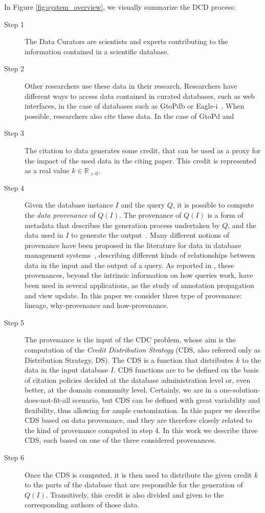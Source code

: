 In Figure \ref{fig:system_overview}, we visually summarize the DCD process:
\begin{description}
	\item[Step 1] The Data Curators are scientists and experts contributing to the information contained in a scientific database. 
	\item[Step 2] Other researchers use these data in their research. Researchers have different ways to access data contained in curated databases, such as web interfaces, in the case of databases such as GtoPdb \citep{iuphar2018} or Eagle-i~\citep{eagleI2017}. When possible, researchers also cite these data. In the case of GtoPd and 
	\item[Step 3] The citation to data generates some credit, that can be used as a proxy for the impact of the used data in the citing paper. This credit is represented as a real value $k \in \mathbb{R}_{>0}$. %
	\item[Step 4] Given the database instance $I$ and the query $Q$, it is possible to compute the \emph{data provenance} of $Q(I)$. The provenance of $Q(I)$ is a form of metadata that describes the generation process undertaken by $Q$, and the data used in $I$ to generate the output~\citep{CheneyProvSurvey}. Many different notions of provenance have been proposed in the literature for data in database management systems~\citep{lineageCui, WhyProvBuneman, howProvenanceGreen, dosso2020prov}, describing different kinds of relationships between data in the input and the output of a query. As reported in \citep{CheneyProvSurvey}, these provenances, beyond the intrinsic information on how queries work, have been used in several applications, as the study of annotation propagation and view update. In this paper we consider three type of provenance: lineage, why-provenance and how-provenance.
	\item[Step 5] The provenance is the input of the CDC problem, whose aim is the computation of the \emph{Credit Distribution Strategy} (CDS, also referred only as Distribution Strategy, DS). The CDS is a function that distributes $k$ to the data in the input database $I$. 
	CDS functions are to be defined on the basis of citation policies decided at the database administration level or, even better, at the domain community level. 
	Certainly, we are in a one-solution-does-not-fit-all scenario, but CDS can be defined with great variability and flexibility, thus allowing for ample customization. 
	In this paper we describe CDS based on data provenance, and they are therefore closely related to the kind of provenance computed in step 4. In this work we describe three CDS, each based on one of the three considered provenances.
	\item[Step 6] Once the CDS is computed, it is then used to distribute the given credit $k$ to the parts of the database that are responsible for the generation of $Q(I)$. Transitively, this credit is also divided and given to the corresponding authors of those data.
\end{description}


